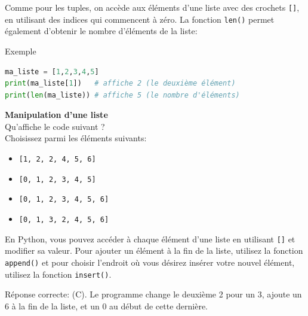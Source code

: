     Comme pour les tuples, on accède aux éléments d'une liste avec des crochets \lstinline{[]}, en utilisant des indices qui commencent à zéro. La fonction \lstinline{len()} permet également d'obtenir le nombre d'éléments de la liste:
    
    \begin{Example}{\faTerminal \quad Exemple}
        \begin{lstlisting}[language=Python]
ma_liste = [1,2,3,4,5]
print(ma_liste[1])   # affiche 2 (le deuxième élément)
print(len(ma_liste)) # affiche 5 (le nombre d'éléments)
        \end{lstlisting}
    \end{Example}
    
    \begin{Exercice}[5 minutes] [Python] \textbf{Manipulation d'une liste}\\
       Qu'affiche le code suivant ? \\
       
       
       
       Choisissez parmi les éléments suivants:
       
       	\begin{itemize}
            \item[(A)] \texttt{[1, 2, 2, 4, 5, 6]}
            \item[(B)] \texttt{[0, 1, 2, 3, 4, 5]}
            \item[(C)] \texttt{[0, 1, 2, 3, 4, 5, 6]}
            \item[(D)] \texttt{[0, 1, 3, 2, 4, 5, 6]}
        \end{itemize}
    
        \begin{conseil}
            En Python, vous pouvez accéder à chaque élément d'une liste en utilisant \lstinline{[]} et modifier sa valeur. Pour ajouter un élément à la fin de la liste, utilisez la fonction \lstinline{append()} et pour choisir l'endroit où vous désirez insérer votre nouvel élément, utilisez la fonction \lstinline{insert()}.
        \end{conseil}
        
        \begin{solution}
            Réponse correcte: (C). Le programme change le deuxième 2 pour un 3, ajoute un 6 à la fin de la liste, et un 0 au début de cette dernière.
        \end{solution}
    \end{Exercice}


